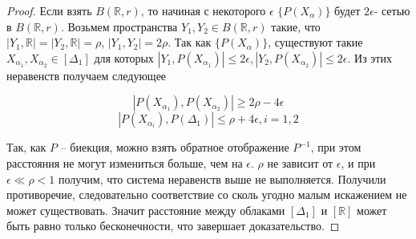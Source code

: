 \begin{proof}
	Если взять $B(\mathbb{R}, r)$, то начиная с некоторого $\epsilon$ $\{P(X_\alpha)\}$ будет $2\epsilon$- сетью в $B(\mathbb{R}, r)$. Возьмем пространства $Y_1, Y_2\in B(\mathbb{R}, r)$ такие, что $|Y_1,\mathbb{R}| = |Y_2,\mathbb{R}| = \rho$, $|Y_1,Y_2| = 2\rho$. Так как $\{P(X_\alpha)\}$, существуют такие $X_{\alpha_1}, X_{\alpha_2}\in [\Delta_1]$ для которых $|Y_1,P(X_{\alpha_1})| \le 2\epsilon, |Y_2,P(X_{\alpha_2})| \le 2\epsilon$. Из этих неравенств получаем следующее
	
	$$|P(X_{\alpha_1}), P(X_{\alpha_2})| \ge 2\rho - 4\epsilon$$
	$$|P(X_{\alpha_i}), P(\Delta_1)| \le \rho + 4\epsilon, i = 1, 2$$
	
	Так, как $P$ -- биекция, можно взять обратное отображение $P^{-1}$, при этом расстояния не могут измениться больше, чем на $\epsilon$. $\rho$ не зависит от $\epsilon$, и при $\epsilon \ll \rho < 1$ получим, что система неравенств выше не выполняется. Получили противоречие, следовательно соответствие со сколь угодно малым искажением не может существовать. Значит расстояние между облаками $[\Delta_1]$ и $[\mathbb{R}]$ может быть равно только бесконечности, что завершает доказательство.
\end{proof}